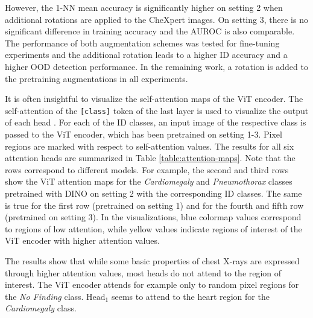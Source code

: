 However, the 1-NN mean accuracy is significantly higher on setting 2 when additional rotations are applied to the CheXpert images.
On setting 3, there is no significant difference in training accuracy and the AUROC is also comparable.
The performance of both augmentation schemes was tested for fine-tuning experiments and the additional rotation leads to a higher ID accuracy and a higher OOD detection performance. 
In the remaining work, a rotation is added to the pretraining augmentations in all experiments.
\par
It is often insightful to visualize the self-attention maps of the ViT encoder.
The self-attention of the \texttt{[class]} token of the last layer is used to visualize the output of each head \citep{Caron2021,Dosovitskiy2020}.
For each of the ID classes, an input image of the respective class is passed to the ViT encoder, which has been pretrained on setting 1-3.
Pixel regions are marked with respect to self-attention values.
The results for all six attention heads are summarized in Table \ref{table:attention-maps}.
Note that the rows correspond to different models.
For example, the second and third rows show the ViT attention maps for the \textit{Cardiomegaly} and \textit{Pneumothorax} classes pretrained with DINO on setting 2 with the corresponding ID classes.
The same is true for the first row (pretrained on setting 1) and for the fourth and fifth row (pretrained on setting 3).
In the visualizations, blue colormap values correspond to regions of low attention, while yellow values indicate regions of interest of the ViT encoder with higher attention values.
\par
The results show that while some basic properties of chest X-rays are expressed through higher attention values, most heads do not attend to the region of interest.
The ViT encoder attends for example only to random pixel regions for the \textit{No Finding} class.
$\text{Head}_1$ seems to attend to the heart region for the \textit{Cardiomegaly} class.

